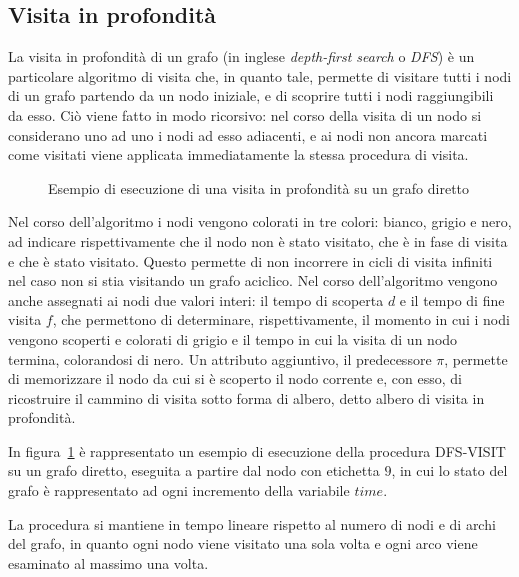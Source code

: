 \subsection{Visita in profondit\`a}
La visita in profondit\`a di un grafo (in inglese \textit{depth-first search} o \textit{DFS}) \`e un particolare
algoritmo di visita che, in quanto tale, permette di visitare tutti i nodi di un grafo partendo da un nodo iniziale,
e di scoprire tutti i nodi raggiungibili da esso.
Ci\`o viene fatto in modo ricorsivo: nel corso della visita di un nodo si considerano uno ad uno i nodi ad esso
adiacenti, e ai nodi non ancora marcati come visitati viene applicata immediatamente la stessa procedura di visita.




\begin{figure}
    
    \caption{Esempio di esecuzione di una visita in profondit\`a su un grafo diretto}
    \label{fig:dfs-example}
\end{figure}

Nel corso dell'algoritmo i nodi vengono colorati in tre colori: bianco, grigio e nero, ad indicare rispettivamente
che il nodo non \`e stato visitato, che \`e in fase di visita e che \`e stato visitato.
Questo permette di non incorrere in cicli di visita infiniti nel caso non si stia visitando un grafo aciclico.
Nel corso dell'algoritmo vengono anche assegnati ai nodi due valori interi: il tempo di scoperta $d$ e il tempo di
fine visita $f$, che permettono di determinare, rispettivamente, il momento in cui i nodi vengono scoperti e colorati
di grigio e il tempo in cui la visita di un nodo termina, colorandosi di nero.
Un attributo aggiuntivo, il predecessore $\pi$, permette di memorizzare il nodo da cui si \`e scoperto il nodo
corrente e, con esso, di ricostruire il cammino di visita sotto forma di albero, detto albero di visita in profondit\`a.
\newline

In figura~\ref{fig:dfs-example} \`e rappresentato un esempio di esecuzione della procedura DFS-VISIT su un grafo
diretto, eseguita a partire dal nodo con etichetta $9$, in cui lo stato del grafo \`e rappresentato ad ogni
incremento della variabile $time$. \newline

La procedura si mantiene in tempo lineare rispetto al numero di nodi e di archi del grafo, in quanto
ogni nodo viene visitato una sola volta e ogni arco viene esaminato al massimo una volta.
